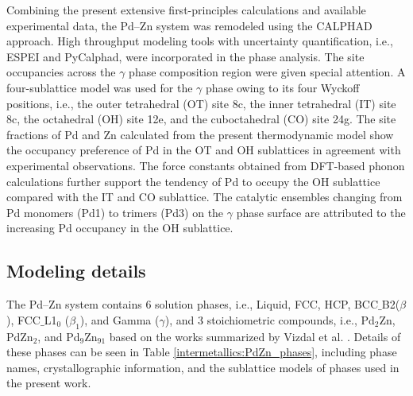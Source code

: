 Combining the present extensive first-principles calculations and available experimental data, the Pd–Zn system was remodeled using the CALPHAD approach. High throughput modeling tools with uncertainty quantification, i.e., ESPEI and PyCalphad, were incorporated in the phase analysis. The site occupancies across the $\gamma$ phase composition region were given special attention. A four-sublattice model was used for the $\gamma$ phase owing to its four Wyckoff positions, i.e., the outer tetrahedral (OT) site 8c, the inner tetrahedral (IT) site 8c, the octahedral (OH) site 12e, and the cuboctahedral (CO) site 24g. The site fractions of Pd and Zn calculated from the present thermodynamic model show the occupancy preference of Pd in the OT and OH sublattices in agreement with experimental observations. The force constants obtained from DFT-based phonon calculations further support the tendency of Pd to occupy the OH sublattice compared with the IT and CO sublattice. The catalytic ensembles changing from Pd monomers (Pd1) to trimers (Pd3) on the $\gamma$ phase surface are attributed to the increasing Pd occupancy in the OH sublattice.

\subsection{Modeling details} \label{intermetallics:ssec:PdZnmodel}
The Pd–Zn system contains 6 solution phases, i.e., Liquid, FCC, HCP, BCC$\_$B2($\beta$), FCC$\_$L1$_0$ ($\beta_1$), and Gamma ($\gamma$), and 3 stoichiometric compounds, i.e., Pd$_2$Zn, PdZn$_2$, and Pd$_9$Zn$_{91}$ based on the works summarized by Vizdal et al. \cite{vizdal2006experimental}. Details of these phases can be seen in Table \ref{intermetallics:PdZn_phases}, including phase names, crystallographic information, and the sublattice models of phases used in the present work.

